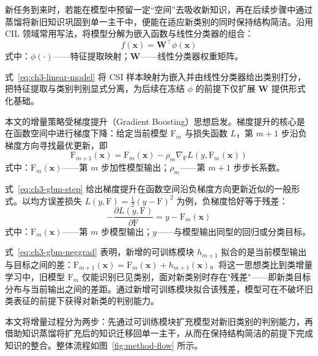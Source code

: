 
新任务到来时，若能在模型中预留一定“空间”去吸收新知识，再在后续步骤中通过蒸馏将新旧知识巩固到单一主干中，便能在适应新类别的同时保持结构简洁。沿用 CIL 领域常用写法\cite{zhou2024cil}，将模型分解为嵌入函数与线性分类器的组合：
\begin{equation}\label{eq:ch3-linear-model}
f(\mathbf{x}) = \mathbf{W}^\top \phi(\mathbf{x})
\end{equation}
\noindent 式中：$\phi(\cdot)$——特征提取映射；$\mathbf{W}$——线性分类器权重矩阵。

式~\eqref{eq:ch3-linear-model} 将 CSI 样本映射为嵌入并由线性分类器给出类别打分，把特征提取与类别判别显式分离，为后续在冻结 $\phi$ 的前提下仅扩展 $\mathbf{W}$ 提供形式化基础。

本文的增量策略受梯度提升（Gradient Boosting）思想启发\cite{friedman2001gbm,wang2022foster}。梯度提升的核心是在函数空间中进行梯度下降：给定当前模型 $\mathrm{F}_m$ 与损失函数 $L$，第 $m+1$ 步沿负梯度方向寻找最优更新，即
\begin{equation}\label{eq:ch3-gbm-step}
\mathrm{F}_{m+1}(\mathbf{x}) = \mathrm{F}_m(\mathbf{x}) - \rho_m \nabla_{\mathrm{F}} L(y, \mathrm{F}_m(\mathbf{x}))
\end{equation}
\noindent 式中：$\mathrm{F}_m(\mathbf{x})$——第 $m$ 步加性模型输出；$\rho_m$——第 $m+1$ 步步长系数。

式~\eqref{eq:ch3-gbm-step} 给出梯度提升在函数空间沿负梯度方向更新近似的一般形式。以均方误差损失 $L(y, \mathrm{F}) = \frac{1}{2}(y - \mathrm{F})^2$ 为例，负梯度恰好等于残差：
\begin{equation}\label{eq:ch3-gbm-neggrad}
-\frac{\partial L(y, \mathrm{F})}{\partial \mathrm{F}} = y - \mathrm{F}_m(\mathbf{x})
\end{equation}
\noindent 式中：$\mathrm{F}_m(\mathbf{x})$——第 $m$ 步模型输出；$y$——与模型输出同型的回归或分类目标。

式~\eqref{eq:ch3-gbm-neggrad} 表明，新增的可训练模块 $h_{m+1}$ 拟合的是当前模型输出与目标之间的差：$\mathrm{F}_{m+1}(\mathbf{x}) = \mathrm{F}_m(\mathbf{x}) + h_{m+1}(\mathbf{x})$。将这一思想类比到类增量学习中，旧模型 $\mathrm{F}_m$ 仅能识别已见类别，面对新类别时存在"残差"——即新类目标分布与当前输出之间的差距。通过新增可训练模块拟合该残差，模型可在不破坏旧类表征的前提下获得对新类的判别能力。

本文将增量过程分为两步：先通过可训练模块扩充模型对新旧类别的判别能力，再借助知识蒸馏将扩充后的知识迁移回单一主干，从而在保持结构简洁的前提下完成知识的整合。整体流程如图~\ref{fig:method-flow} 所示。

